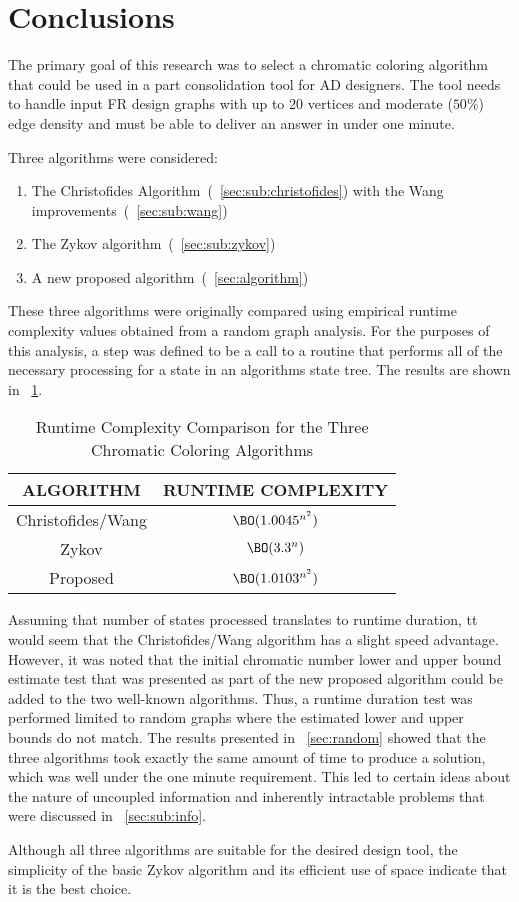 \section{Conclusions}\label{sec:conclusions}

The primary goal of this research was to select a chromatic coloring algorithm that could be used in a part
consolidation tool for AD designers.  The tool needs to handle input FR design graphs with up to \(20\)
vertices and moderate (\(50\%\)) edge density and must be able to deliver an answer in under one minute.

Three algorithms were considered:
\begin{enumerate}
\item The Christofides Algorithm~(\sectionname~\ref{sec:sub:christofides}) with the
  Wang improvements~(\sectionname~\ref{sec:sub:wang})
\item The Zykov algorithm~(\sectionname~\ref{sec:sub:zykov})
\item A new proposed algorithm~(\sectionname~\ref{sec:algorithm})
\end{enumerate}

These three algorithms were originally compared using empirical runtime complexity values obtained from a random
graph analysis.  For the purposes of this analysis, a step was defined to be a call to a routine that performs all
of the necessary processing for a state in an algorithms state tree.  The results are shown in
\tablename~\ref{tab:rtresults}.

\begin{table}[H]
  \centering
  \caption{Runtime Complexity Comparison for the Three Chromatic Coloring Algorithms}
  \label{tab:rtresults}
  \begin{tabular}{|c|c|}
    \hline
    ALGORITHM & RUNTIME COMPLEXITY \\
    \hline
    Christofides/Wang & \(\BO(1.0045^{n^2})\) \\
    \hline
    Zykov & \(\BO(3.3^n)\) \\
    \hline
    Proposed & \(\BO(1.0103^{n^2})\) \\
    \hline
  \end{tabular}
\end{table}

Assuming that number of states processed translates to runtime duration, tt would seem that the Christofides/Wang
algorithm has a slight speed advantage.  However, it was noted that the initial chromatic number lower and upper
bound estimate test that was presented as part of the new proposed algorithm could be added to the two well-known
algorithms.  Thus, a runtime duration test was performed limited to random graphs where the estimated lower and
upper bounds do not match.  The results presented in \sectionname~\ref{sec:random} showed that the three algorithms
took exactly the same amount of time to produce a solution, which was well under the one minute requirement.  This
led to certain ideas about the nature of uncoupled information and inherently intractable problems that were
discussed in \sectionname~\ref{sec:sub:info}.

Although all three algorithms are suitable for the desired design tool, the simplicity of the basic Zykov algorithm
and its efficient use of space indicate that it is the best choice.

